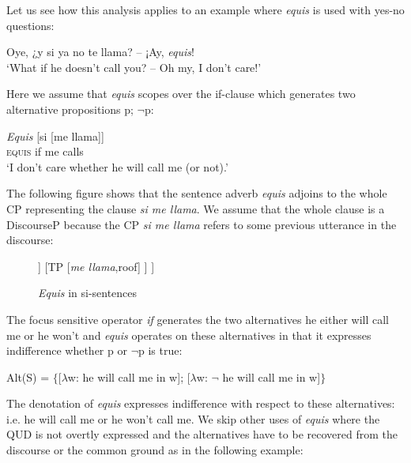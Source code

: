 \documentclass[output=paper
,modfonts
,nonflat]{langsci/langscibook}
\begin{document}
Let us see how this analysis applies to an example where \textit{equis} is used with yes-no questions:

\ea
Oye, {¿}y si ya no te llama? – {¡}Ay, \textit{equis}!\\
\glt ‘What if he doesn’t call you? – Oh my, I don’t care!’
\z

Here we assume that \textit{equis} scopes over the if-clause which generates two alternative propositions {p; $¬$p}:

\ea 
\gll \textit{Equis} [si [me llama]]\\  
\textsc{equis} if me calls\\
\glt ‘I don’t care whether he will call me (or not).’    
\z

The following figure shows that the sentence adverb \textit{equis} adjoins to the whole CP representing the clause \textit{si me llama}. We assume that the whole clause is a DiscourseP because the CP \textit{si me llama} refers to some previous utterance in the discourse:


\begin{figure}
	\caption{\textit{Equis} in si-sentences\label{fig:kellert:tree3}}
	\begin{forest}
		[DiscourseP
			[\textit{Equis}] [CP
				[C\textsuperscript{0}\\\textit{si}]
			] [TP
				[\textit{me llama},roof]
			]
		]
	\end{forest}
\end{figure}

The focus sensitive operator \textit{if} generates the two alternatives he either will call me or he won’t and \textit{equis} operates on these alternatives in that it expresses indifference whether p or $¬$p is true:

\ea Alt(S) = $\lbrace${[}$\lambda$w: he will call me in w{]}; {[}$\lambda$w: $¬$ he will call me in w{]}$\rbrace$
\z

The denotation of \textit{equis} expresses indifference with respect to these alternatives: i.e. he will call me or he won’t call me. We skip other uses of \textit{equis} where the QUD is not overtly expressed and the alternatives have to be recovered from the discourse or the common ground as in the following example:
\end{document}
